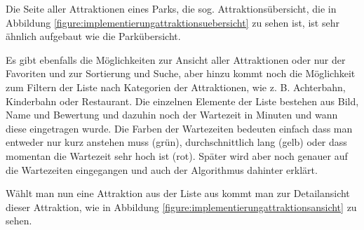Die Seite aller Attraktionen eines Parks, die sog. Attraktionsübersicht, die in Abbildung \ref{figure:implementierungattraktionsuebersicht} zu sehen ist, ist sehr ähnlich aufgebaut wie die Parkübersicht. 

Es gibt ebenfalls die Möglichkeiten zur Ansicht aller Attraktionen oder nur der Favoriten und zur Sortierung und Suche, aber hinzu kommt noch die Möglichkeit zum Filtern der Liste nach Kategorien der Attraktionen, wie z. B. Achterbahn, Kinderbahn oder Restaurant. Die einzelnen Elemente der Liste bestehen aus Bild, Name und Bewertung und dazuhin noch der Wartezeit in Minuten und wann diese eingetragen wurde. Die Farben der Wartezeiten bedeuten einfach dass man entweder nur kurz anstehen muss (grün), durchschnittlich lang (gelb) oder dass momentan die Wartezeit sehr hoch ist (rot). Später wird aber noch genauer auf die Wartezeiten eingegangen und auch der Algorithmus dahinter erklärt. 

Wählt man nun eine Attraktion aus der Liste aus kommt man zur Detailansicht dieser Attraktion, wie in Abbildung \ref{figure:implementierungattraktionsansicht} zu sehen.

\newpage

